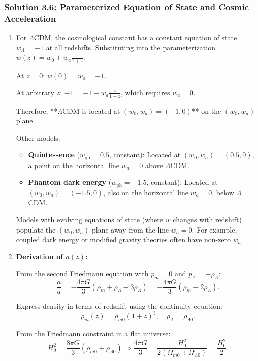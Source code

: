 \subsubsection*{Solution 3.6: Parameterized Equation of State and Cosmic Acceleration}

\begin{enumerate}[label=(\alph*)]
  \item For $\Lambda$CDM, the cosmological constant has a constant equation of state $w_\Lambda=-1$ at all redshifts. Substituting into the parameterization $w(z)=w_0+w_a\frac{z}{1+z}$:
  
  At $z=0$: $w(0)=w_0=-1$.
  
  At arbitrary $z$: $-1 = -1 + w_a\frac{z}{1+z}$, which requires $w_a=0$.
  
  Therefore, **$\Lambda$CDM is located at $(w_0, w_a)=(-1, 0)$** on the $(w_0, w_a)$ plane.
  
  Other models:
  \begin{itemize}
    \item \textbf{Quintessence} ($w_\text{qu}=0.5$, constant): Located at $(w_0, w_a)=(0.5, 0)$, a point on the horizontal line $w_a=0$ above $\Lambda$CDM.
    \item \textbf{Phantom dark energy} ($w_\text{ph}=-1.5$, constant): Located at $(w_0, w_a)=(-1.5, 0)$, also on the horizontal line $w_a=0$, below $\Lambda$CDM.
  \end{itemize}
  
  Models with evolving equations of state (where $w$ changes with redshift) populate the $(w_0, w_a)$ plane away from the line $w_a=0$. For example, coupled dark energy or modified gravity theories often have non-zero $w_a$.

  \item \textbf{Derivation of $\ddot{a}(z)$:}
  
  From the second Friedmann equation with $p_m=0$ and $p_\Lambda=-\rho_\Lambda$:
  \[
    \frac{\ddot{a}}{a}=-\frac{4\pi G}{3}\left(\rho_m + \rho_\Lambda - 3\rho_\Lambda\right)=-\frac{4\pi G}{3}\left(\rho_m - 2\rho_\Lambda\right).
  \]
  
  Express density in terms of redshift using the continuity equation:
  \[
    \rho_m(z)=\rho_{m0}(1+z)^3,\quad \rho_\Lambda=\rho_{\Lambda0}.
  \]
  
  From the Friedmann constraint in a flat universe:
  \[
    H_0^2=\frac{8\pi G}{3}(\rho_{m0}+\rho_{\Lambda0})
    \Rightarrow
    \frac{4\pi G}{3}=\frac{H_0^2}{2(\Omega_{m0}+\Omega_{\Lambda0})}=\frac{H_0^2}{2}.
  \]
  

\end{enumerate}
